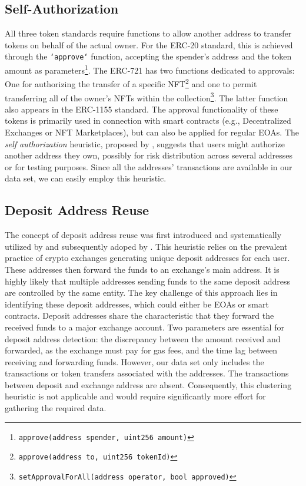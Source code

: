 \documentclass[12pt,a4paper,titlepage,oneside,english]{article}
\begin{document}
\subsection{Self-Authorization} 
	All three token standards require functions to allow another address to transfer tokens on behalf of the actual owner. For the ERC-20 standard, this is achieved through the \texttt{`approve`} function, accepting the spender's address and the token amount as parameters\footnote{\texttt{approve(address spender, uint256 amount)}}. The ERC-721 has two functions dedicated to approvals: One for authorizing the transfer of a specific NFT\footnote{\texttt{approve(address to, uint256 tokenId)}} and one to permit transferring all of the owner's NFTs within the collection\footnote{\texttt{setApprovalForAll(address operator, bool approved)}}. The latter function also appears in the ERC-1155 standard. The approval functionality of these tokens is primarily used in connection with smart contracts (e.g., Decentralized Exchanges or NFT Marketplaces), but can also be applied for regular EOAs. \newline
The \textit{self authorization} heuristic, proposed by \cite{FV:17}, suggests that users might authorize another address they own, possibly for risk distribution across several addresses or for testing purposes. Since all the addresses' transactions are available in our data set, we can easily employ this heuristic.

\subsection{Deposit Address Reuse}
The concept of deposit address reuse was first introduced and systematically utilized by \cite{FV:17} and subsequently adoped by \cite{wu2022tutela}. This heuristic relies on the prevalent practice of crypto exchanges generating unique deposit addresses for each user. These addresses then forward the funds to an exchange's main address. It is highly likely that multiple addresses sending funds to the same deposit address are controlled by the same entity. The key challenge of this approach lies in identifying these deposit addresses, which could either be EOAs or smart contracts. \citep{FV:17}\newline
Deposit addresses share the characteristic that they forward the received funds to a major exchange account. Two parameters are essential for deposit address detection: the discrepancy between the amount received and forwarded, as the exchange must pay for gas fees, and the time lag between receiving and forwarding funds.
However, our data set only includes the transactions or token transfers associated with the addresses. The transactions between deposit and exchange address are absent. Consequently, this clustering heuristic is not applicable and would require significantly more effort for gathering the required data.
\end{document}
